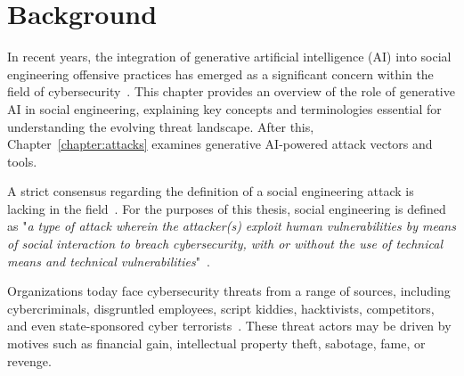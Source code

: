 


\chapter{Background\label{chapter:background}}
\begin{comment}

From study materials:
    - "Konteksti ja käsitteet, haasteet ja arviointikriteerit, arvot, tutkimuskysymysten analyysi"
    - Context and terminology (käsitteet), challenges and measurement criteria, values, research question analysis
    - Tarkentaa tavoiteet ja osakysymykset, vertailukriteerit (jotka jäsentävät muita lukuja)


\end{comment}



%
%
In recent years, the integration of generative artificial intelligence (AI) into social engineering offensive practices has emerged as a significant concern within the field of cybersecurity~\citep{blauth_AI_Crime_Overview_Malicious_Use_Abuse_2022, king_AI_Crime_Interdisciplinary_Analysis_2019, mirsky_Threat_Offensive_AI_Organizations_2023}. This chapter provides an overview of the role of generative AI in social engineering, explaining key concepts and terminologies essential for understanding the evolving threat landscape. After this, Chapter~\ref{chapter:attacks} examines generative AI-powered attack vectors and tools.





%
%
A strict consensus regarding the definition of a social engineering attack is lacking in the field~\citep{hatfield_SE_Evolution_Concept_2018}. For the purposes of this thesis, social engineering is defined as "\textit{a type of attack wherein the attacker(s) exploit human vulnerabilities by means of social interaction to breach cybersecurity, with or without the use of technical means and technical vulnerabilities}"~\citep{wang_Defining_Social_Engineering_2020}.








%
%
Organizations today face cybersecurity threats from a range of sources, including cybercriminals, disgruntled employees, script kiddies, hacktivists, competitors, and even state-sponsored cyber terrorists~\citep{mirsky_Threat_Offensive_AI_Organizations_2023}. These threat actors may be driven by motives such as financial gain, intellectual property theft, sabotage, fame, or revenge.

